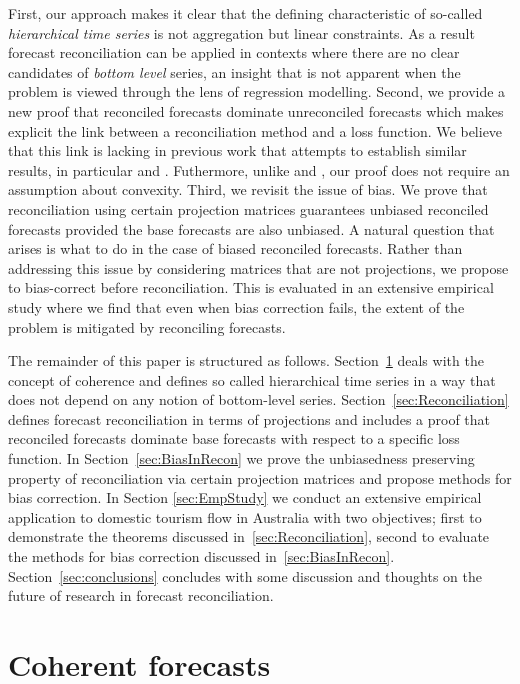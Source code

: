 \documentclass[12pt]{article}
\theoremstyle{definition}
\begin{document}
First, our approach makes it clear that the defining characteristic of so-called \emph{hierarchical time series} is not aggregation but linear constraints. As a result forecast reconciliation can be applied in contexts where there are no clear candidates of \emph{bottom level} series, an insight that is not apparent when the problem is viewed through the lens of regression modelling. Second, we provide a new proof that reconciled forecasts dominate unreconciled forecasts which makes explicit the link between a reconciliation method and a loss function. We believe that this link is lacking in previous work that attempts to establish similar results, in particular \citet{VanErven2015a} and \citet{WicEtAl2019}. Futhermore, unlike \citet{VanErven2015a} and \citet{WicEtAl2019}, our proof does not require an assumption about convexity. Third, we revisit the issue of bias. We prove that reconciliation using certain projection matrices guarantees unbiased reconciled forecasts provided the base forecasts are also unbiased. A natural question that arises is what to do in the case of biased reconciled forecasts. Rather than addressing this issue by considering matrices that are not projections, we propose to bias-correct before reconciliation. This is evaluated in an extensive empirical study where we find that even when bias correction fails, the extent of the problem is mitigated by reconciling forecasts.

The remainder of this paper is structured as follows. Section~\ref{sec:CoheForecasts} deals with the concept of coherence and defines so called hierarchical time series in a way that does not depend on any notion of bottom-level series. Section~\ref{sec:Reconciliation} defines forecast reconciliation in terms of projections and includes a proof that reconciled forecasts dominate base forecasts with respect to a specific loss function. In Section~\ref{sec:BiasInRecon} we prove the unbiasedness preserving property of reconciliation via certain projection matrices and propose methods for bias correction. In Section \ref{sec:EmpStudy} we conduct an extensive empirical application to domestic tourism flow in Australia with two objectives; first to demonstrate the theorems discussed in~\ref{sec:Reconciliation}, second to evaluate the methods for bias correction discussed in~\ref{sec:BiasInRecon}. Section~\ref{sec:conclusions} concludes with some discussion and thoughts on the future of research in forecast reconciliation.

\section{Coherent forecasts}\label{sec:CoheForecasts}
\end{document}
